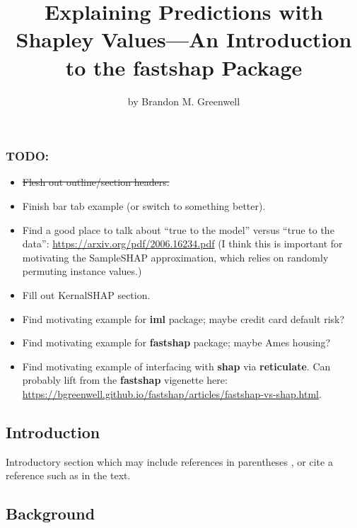 \title{Explaining Predictions with Shapley Values---An Introduction to
the fastshap Package}
\author{by Brandon M. Greenwell}

\maketitle


\hypertarget{todo}{%
\subsubsection{TODO:}\label{todo}}

\begin{itemize}
\tightlist
\item
  \sout{Flesh out outline/section headers.}
\item
  Finish bar tab example (or switch to something better).
\item
  Find a good place to talk about ``true to the model'' versus ``true to
  the data'': \url{https://arxiv.org/pdf/2006.16234.pdf} (I think this
  is important for motivating the SampleSHAP approximation, which relies
  on randomly permuting instance values.)
\item
  Fill out KernalSHAP section.
\item
  Find motivating example for \textbf{iml} package; maybe credit card
  default risk?
\item
  Find motivating example for \textbf{fastshap} package; maybe Ames
  housing?
\item
  Find motivating example of interfacing with \textbf{shap} via
  \textbf{reticulate}. Can probably lift from the \textbf{fastshap}
  vigenette here:
  \url{https://bgreenwell.github.io/fastshap/articles/fastshap-vs-shap.html}.
\end{itemize}

\hypertarget{introduction}{%
\subsection{Introduction}\label{introduction}}

Introductory section which may include references in parentheses
\citep{R}, or cite a reference such as \citet{R} in the text.

\hypertarget{background}{%
\subsection{Background}\label{background}}

